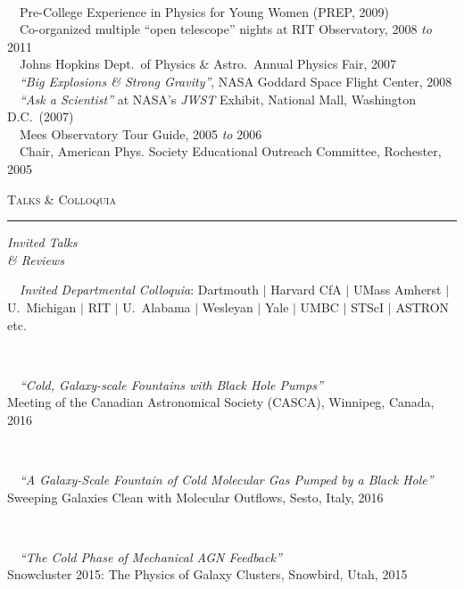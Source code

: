 \documentclass[11pt]{article}
\makeatletter
\def\vhrulefill#1{\leavevmode\leaders\hrule\@height#1\hfill \kern\z@}
\makeatother
\begin{document}
{\\ \textbullet~~Pre-College Experience in Physics for Young Women (PREP, 2009)
\\ \textbullet~~Co-organized multiple ``open telescope'' nights at RIT Observatory, 2008 \textit{to} 2011
\\ \textbullet~~Johns Hopkins Dept.~of Physics \& Astro.~Annual Physics Fair, 2007
\\ \textbullet~~\textit{``Big Explosions \& Strong Gravity''}, NASA Goddard Space Flight Center, 2008
\\ \textbullet~~\textit{``Ask a Scientist''} at NASA's \textit{JWST} Exhibit, National Mall, Washington D.C.~(2007)
\\ \textbullet~~Mees Observatory Tour Guide, 2005 \textit{to} 2006
\\ \textbullet~~Chair, American Phys. Society Educational Outreach Committee, Rochester, 2005
}



\vspace{4mm}



\textsc{Talks \& Colloquia} \vhrulefill{0.4pt}

\vspace{4mm}

\hspace{2.5mm} \parbox{1.5in}{\textit{Invited Talks \\ \& Reviews }}
\parbox{5.15in}{
\textbullet~~\textit{Invited Departmental Colloquia}: Dartmouth $|$ Harvard CfA $|$ UMass Amherst $|$ U.~Michigan $|$ RIT $|$ U.~Alabama $|$ Wesleyan $|$ Yale $|$ UMBC $|$ STScI $|$ ASTRON etc.} \\


\hspace{42mm} \parbox{5.15in}{
\textbullet~~\textit{``Cold, Galaxy-scale Fountains with Black Hole Pumps''}\\ Meeting of the Canadian Astronomical Society (CASCA), Winnipeg, Canada, 2016}\\


\hspace{42mm} \parbox{5.15in}{
\textbullet~~\textit{``A Galaxy-Scale Fountain of Cold Molecular Gas Pumped by a Black Hole''}\\ Sweeping Galaxies Clean with Molecular Outflows, Sesto, Italy, 2016}\\



\hspace{42mm} \parbox{5.15in}{
\textbullet~~\textit{``The Cold Phase of Mechanical AGN Feedback''}\\ Snowcluster 2015: The Physics of Galaxy Clusters, Snowbird, Utah, 2015}\\
\end{document}

